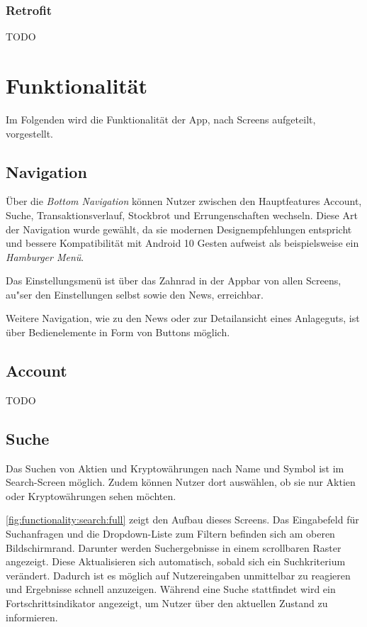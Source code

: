 \documentclass[a4paper]{article}
\begin{document}
\subsubsection{Retrofit}
\label{subsubsec:technologies:bibs:retrofit}
TODO


\section{Funktionalität}
\label{sec:functionality}
Im Folgenden wird die Funktionalität der App, nach Screens aufgeteilt, vorgestellt.


\subsection{Navigation}
\label{subsec:functionality:navigation}
Über die \textit{Bottom Navigation}\autocite{bottom_navigation} können Nutzer zwischen den Hauptfeatures Account, Suche, Transaktionsverlauf, Stockbrot und Errungenschaften wechseln.
Diese Art der Navigation wurde gewählt, da sie modernen Designempfehlungen entspricht und bessere Kompatibilität mit Android 10 Gesten aufweist als beispielsweise ein \textit{Hamburger Menü}.

Das Einstellungsmenü ist über das Zahnrad in der Appbar von allen Screens, au"ser den Einstellungen selbst sowie den News, erreichbar.

Weitere Navigation, wie zu den News oder zur Detailansicht eines Anlageguts, ist über Bedienelemente in Form von Buttons möglich.


\subsection{Account}
\label{subsec:functionality:account}
TODO


\subsection{Suche}
\label{subsec:functionality:search}
Das Suchen von Aktien und Kryptowährungen nach Name und Symbol ist im Search-Screen möglich.
Zudem können Nutzer dort auswählen, ob sie nur Aktien oder Kryptowährungen sehen möchten.

\autoref{fig:functionality:search:full} zeigt den Aufbau dieses Screens.
Das Eingabefeld für Suchanfragen und die Dropdown-Liste zum Filtern befinden sich am oberen Bildschirmrand.
Darunter werden Suchergebnisse in einem scrollbaren Raster angezeigt.
Diese Aktualisieren sich automatisch, sobald sich ein Suchkriterium verändert.
Dadurch ist es möglich auf Nutzereingaben unmittelbar zu reagieren und Ergebnisse schnell anzuzeigen.
Während eine Suche stattfindet wird ein Fortschritts\-indikator angezeigt, um Nutzer über den aktuellen Zustand zu informieren.
\end{document}
